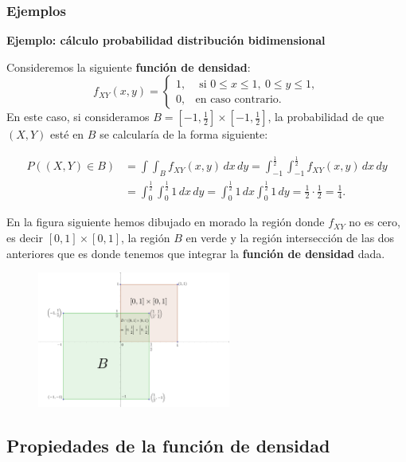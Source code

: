 \documentclass[]{book}
\begin{document}
\hypertarget{ejemplos}{%
\subsubsection{Ejemplos}\label{ejemplos}}

\textbf{Ejemplo: cálculo probabilidad distribución bidimensional}

Consideremos la siguiente \textbf{función de densidad}:
\[
f_{XY}(x,y)=\begin{cases}
1, & \mbox{ si }0\leq x\leq 1,\ 0\leq y\leq 1, \\
0, & \mbox{en caso contrario.}
\end{cases}
\]
En este caso, si consideramos \(B=\left[-1,\frac{1}{2}\right]\times \left[-1,\frac{1}{2}\right]\), la probabilidad de que \((X,Y)\) esté en \(B\) se calcularía de la forma siguiente:

\[
\begin{array}{rl}
P((X,Y)\in B)&=\int\int_{B} f_{XY}(x,y)\, dx\, dy=\int_{-1}^{\frac{1}{2}}\int_{-1}^{\frac{1}{2}} f_{XY}(x,y)\, dx\, dy \\
&=\int_0^{\frac{1}{2}}\int_0^{\frac{1}{2}} 1\, dx\,dy=\int_0^{\frac{1}{2}} 1\, dx\int_0^{\frac{1}{2}} 1\, dy=\frac{1}{2}\cdot\frac{1}{2}=\frac{1}{4}.
\end{array}
\]

En la figura siguiente hemos dibujado en morado la región donde \(f_{XY}\) no es cero, es decir \([0,1]\times [0,1]\), la región \(B\) en verde y la región intersección de las dos anteriores que es donde tenemos que integrar la \textbf{función de densidad} dada.

\begin{figure}
\includegraphics[width=2.5in]{Images/VaUniformeBidi} \end{figure}

\hypertarget{propiedades-de-la-funciuxf3n-de-densidad}{%
\subsection{Propiedades de la función de densidad}\label{propiedades-de-la-funciuxf3n-de-densidad}}
\end{document}
